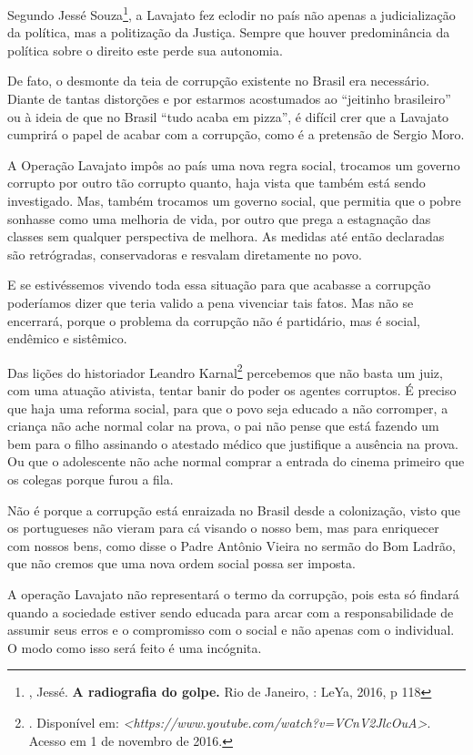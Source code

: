 Segundo Jessé Souza\footnote{, Jessé. \textbf{A radiografia do
  golpe.} Rio de Janeiro, : LeYa, 2016, p 118}, a Lavajato fez eclodir
no país não apenas a judicialização da política, mas a politização da
Justiça. Sempre que houver predominância da política sobre o direito
este perde sua autonomia.

De fato, o desmonte da teia de corrupção existente no Brasil era
necessário. Diante de tantas distorções e por estarmos acostumados ao
``jeitinho brasileiro'' ou à ideia de que no Brasil ``tudo acaba em
pizza'', é difícil crer que a Lavajato cumprirá o papel de acabar com a
corrupção, como é a pretensão de Sergio Moro.

A Operação Lavajato impôs ao país uma nova regra social, trocamos um
governo corrupto por outro tão corrupto quanto, haja vista que também
está sendo investigado. Mas, também trocamos um governo social, que
permitia que o pobre sonhasse como uma melhoria de vida, por outro que
prega a estagnação das classes sem qualquer perspectiva de melhora. As
medidas até então declaradas são retrógradas, conservadoras e resvalam
diretamente no povo.

E se estivéssemos vivendo toda essa situação para que acabasse a
corrupção poderíamos dizer que teria valido a pena vivenciar tais fatos.
Mas não se encerrará, porque o problema da corrupção não é partidário,
mas é social, endêmico e sistêmico.

Das lições do historiador Leandro Karnal\footnote{. Disponível em:
  \emph{\textless{}https://www.youtube.com/watch?v=VCnV2JlcOuA\textgreater{}}.
  Acesso em 1 de novembro de 2016.} percebemos que não basta um juiz,
com uma atuação ativista, tentar banir do poder os agentes corruptos. É
preciso que haja uma reforma social, para que o povo seja educado a não
corromper, a criança não ache normal colar na prova, o pai não pense que
está fazendo um bem para o filho assinando o atestado médico que
justifique a ausência na prova. Ou que o adolescente não ache normal
comprar a entrada do cinema primeiro que os colegas porque furou a fila.

Não é porque a corrupção está enraizada no Brasil desde a colonização,
visto que os portugueses não vieram para cá visando o nosso bem, mas
para enriquecer com nossos bens, como disse o Padre Antônio Vieira no
sermão do Bom Ladrão, que não cremos que uma nova ordem social possa ser
imposta.

A operação Lavajato não representará o termo da corrupção, pois esta só
findará quando a sociedade estiver sendo educada para arcar com a
responsabilidade de assumir seus erros e o compromisso com o social e
não apenas com o individual. O modo como isso será feito é uma
incógnita.

